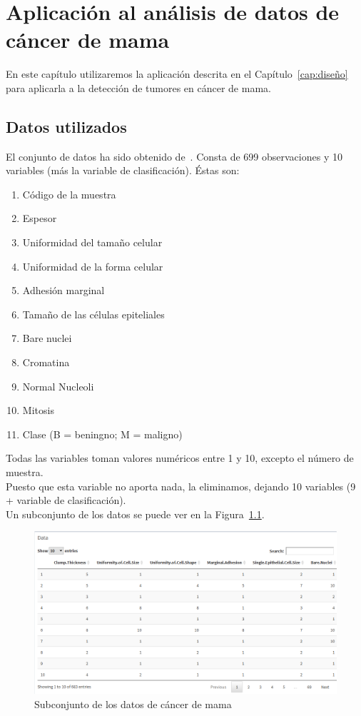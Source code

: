 \chapter[Aplicación al cáncer de mama]{Aplicación al análisis de datos de cáncer de mama}

En este capítulo utilizaremos la aplicación descrita en el Capítulo~\ref{cap:diseño} para aplicarla a la detección de tumores en cáncer de mama.

\section{Datos utilizados}

El conjunto de datos ha sido obtenido de~\cite{cancer}. Consta de 699 observaciones y 10 variables (más la variable de clasificación). Éstas son:

\begin{enumerate}
	\item Código de la muestra
	\item Espesor
	\item Uniformidad del tamaño celular
	\item Uniformidad de la forma celular
	\item Adhesión marginal
	\item Tamaño de las células epiteliales
	\item Bare nuclei
	\item Cromatina
	\item Normal Nucleoli
	\item Mitosis
	\item Clase (B = beningno; M = maligno)
\end{enumerate}

Todas las variables toman valores numéricos entre 1 y 10, excepto el número de muestra.\\

Puesto que esta variable no aporta nada, la eliminamos, dejando 10 variables (9 + variable de clasificación).\\

Un subconjunto de los datos se puede ver en la Figura~\ref{fig:datos_cancer}.\\

\begin{figure}[tbph!]
\centering
\includegraphics[width=0.6\linewidth]{imagenes/cancer/datos.png}
\caption{Subconjunto de los datos de cáncer de mama}
\label{fig:datos_cancer}
\end{figure}


